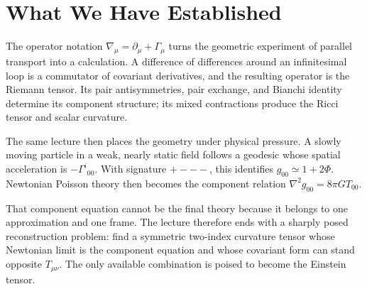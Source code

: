 \begin{classroomqa}
\end{classroomqa}

\section{What We Have Established}

The operator notation
\(\nabla_\mu=\partial_\mu+\Gamma_\mu\) turns the geometric experiment of
parallel transport into a calculation. A difference of differences
around an infinitesimal loop is a commutator of covariant derivatives,
and the resulting operator is the Riemann tensor. Its pair
antisymmetries, pair exchange, and Bianchi identity determine its
component structure; its mixed contractions produce the Ricci tensor
and scalar curvature.

The same lecture then places the geometry under physical pressure. A
slowly moving particle in a weak, nearly static field follows a geodesic
whose spatial acceleration is
\(-\Gamma^i{}_{00}\). With signature \(+---\), this identifies
\(g_{00}\simeq1+2\Phi\). Newtonian Poisson theory then becomes the
component relation
\(\nabla^2g_{00}=8\pi G T_{00}\).

That component equation cannot be the final theory because it belongs
to one approximation and one frame. The lecture therefore ends with a
sharply posed reconstruction problem: find a symmetric two-index
curvature tensor whose Newtonian limit is the component equation and
whose covariant form can stand opposite \(T_{\mu\nu}\). The only
available combination is poised to become the Einstein tensor.
